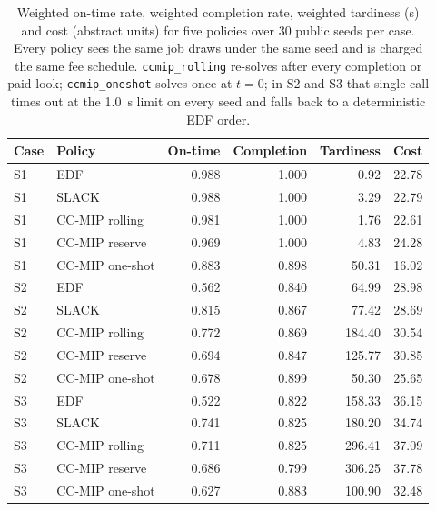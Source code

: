 \documentclass{swmcmthesis}
\begin{document}
\begin{table}[tbp]\centering\footnotesize
\caption{Weighted on-time rate, weighted completion rate, weighted tardiness (s) and cost (abstract units) for five policies over 30 public seeds per case. Every policy sees the same job draws under the same seed and is charged the same fee schedule. \texttt{ccmip\_rolling} re-solves after every completion or paid look; \texttt{ccmip\_oneshot} solves once at $t=0$; in S2 and S3 that single call times out at the 1.0~s limit on every seed and falls back to a deterministic EDF order.}
\label{tab:p3}
\begin{tabular}{llrrrr}
\toprule
Case & Policy & On-time & Completion & Tardiness & Cost \\
\midrule
S1 & EDF & 0.988 & 1.000 & 0.92 & 22.78 \\
S1 & SLACK & 0.988 & 1.000 & 3.29 & 22.79 \\
S1 & CC-MIP rolling & 0.981 & 1.000 & 1.76 & 22.61 \\
S1 & CC-MIP reserve & 0.969 & 1.000 & 4.83 & 24.28 \\
S1 & CC-MIP one-shot & 0.883 & 0.898 & 50.31 & 16.02 \\
\midrule
S2 & EDF & 0.562 & 0.840 & 64.99 & 28.98 \\
S2 & SLACK & 0.815 & 0.867 & 77.42 & 28.69 \\
S2 & CC-MIP rolling & 0.772 & 0.869 & 184.40 & 30.54 \\
S2 & CC-MIP reserve & 0.694 & 0.847 & 125.77 & 30.85 \\
S2 & CC-MIP one-shot & 0.678 & 0.899 & 50.30 & 25.65 \\
\midrule
S3 & EDF & 0.522 & 0.822 & 158.33 & 36.15 \\
S3 & SLACK & 0.741 & 0.825 & 180.20 & 34.74 \\
S3 & CC-MIP rolling & 0.711 & 0.825 & 296.41 & 37.09 \\
S3 & CC-MIP reserve & 0.686 & 0.799 & 306.25 & 37.78 \\
S3 & CC-MIP one-shot & 0.627 & 0.883 & 100.90 & 32.48 \\
\bottomrule
\end{tabular}
\end{table}
\end{document}
